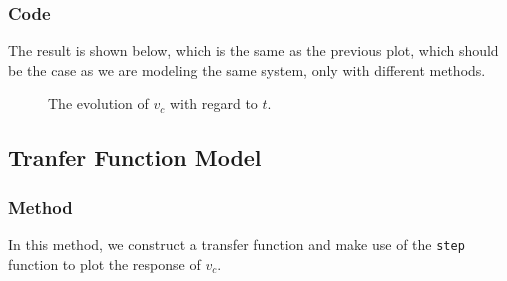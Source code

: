 \documentclass{article}
\begin{document}
  \subsubsection{Code}
  \par
  The result is shown below, which is the same as the previous plot, which should be the case as we are modeling the same system, only with different methods.
  \begin{figure}[H]
    \centering
    \noindent{}
    \caption{The evolution of $v_c$ with regard to $t$.} \label{fig:ss}
  \end{figure}
  
  \subsection{Tranfer Function Model}
  \subsubsection{Method}
  In this method, we construct a transfer function and make use of the \verb+step+ function to plot the response of $v_c$.
\end{document}
